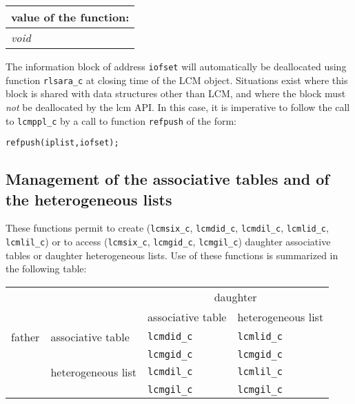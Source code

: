 \vskip 0.8cm

\noindent
\begin{tabular}{|p{4.0cm}|p{11cm}|}
\hline
\multicolumn{2}{|c|}{\bf value of the function:} \\
\hline
{\it void} &  \\
\hline
\end{tabular}

\vskip 0.4cm

The information block of address {\tt iofset} will automatically be deallocated using function  {\tt rlsara\_c} 
at closing time of the LCM object. Situations exist where this block is shared with data structures other
than LCM, and where the block must {\sl not} be deallocated by the {\sc lcm} API. In this case, it is imperative
to follow the call to {\tt lcmppl\_c} by a call to function {\tt refpush} of the form:

\begin{verbatim}
refpush(iplist,iofset);
\end{verbatim}

\vskip 0.8cm

\subsection{Management of the associative tables and of the heterogeneous lists}

These functions permit to create ({\tt lcmsix\_c}, {\tt lcmdid\_c}, {\tt lcmdil\_c},
{\tt lcmlid\_c}, {\tt lcmlil\_c}) or to access ({\tt lcmsix\_c}, {\tt lcmgid\_c}, {\tt lcmgil\_c})
daughter associative tables or daughter heterogeneous lists. Use of these functions is summarized in the following table:

\vskip 0.4cm

\begin{center}
\begin{tabular}{|c|l|l|l|}
\cline{3-4}
\multicolumn{2}{c|}{} & \multicolumn{2}{c|}{daughter} \\
\cline{3-4}
\multicolumn{2}{c|}{} & associative table & heterogeneous list \\
\hline
father & associative table & {\tt lcmdid\_c} & {\tt lcmlid\_c} \\
       &                   & {\tt lcmgid\_c} & {\tt lcmgid\_c} \\
\cline{2-4}
       &heterogeneous list & {\tt lcmdil\_c} & {\tt lcmlil\_c} \\
       &                   & {\tt lcmgil\_c} & {\tt lcmgil\_c} \\
\hline
\end{tabular}
\end{center}

